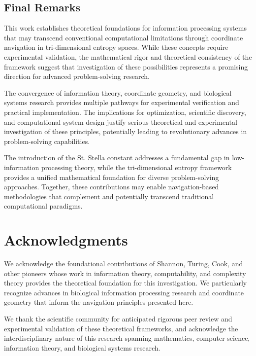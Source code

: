\documentclass[12pt,a4paper]{article}
\begin{document}
\subsection{Final Remarks}

This work establishes theoretical foundations for information processing systems that may transcend conventional computational limitations through coordinate navigation in tri-dimensional entropy spaces. While these concepts require experimental validation, the mathematical rigor and theoretical consistency of the framework suggest that investigation of these possibilities represents a promising direction for advanced problem-solving research.

The convergence of information theory, coordinate geometry, and biological systems research provides multiple pathways for experimental verification and practical implementation. The implications for optimization, scientific discovery, and computational system design justify serious theoretical and experimental investigation of these principles, potentially leading to revolutionary advances in problem-solving capabilities.

The introduction of the St. Stella constant addresses a fundamental gap in low-information processing theory, while the tri-dimensional entropy framework provides a unified mathematical foundation for diverse problem-solving approaches. Together, these contributions may enable navigation-based methodologies that complement and potentially transcend traditional computational paradigms.

\section*{Acknowledgments}

We acknowledge the foundational contributions of Shannon, Turing, Cook, and other pioneers whose work in information theory, computability, and complexity theory provides the theoretical foundation for this investigation. We particularly recognize advances in biological information processing research and coordinate geometry that inform the navigation principles presented here.

We thank the scientific community for anticipated rigorous peer review and experimental validation of these theoretical frameworks, and acknowledge the interdisciplinary nature of this research spanning mathematics, computer science, information theory, and biological systems research.
\end{document}
